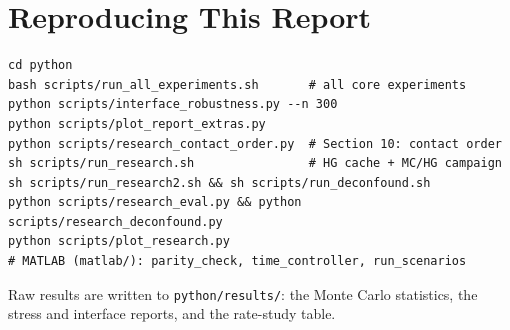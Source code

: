 \documentclass[11pt,a4paper]{article}
\begin{document}
\section{Reproducing This Report}
\begin{verbatim}
cd python
bash scripts/run_all_experiments.sh       # all core experiments
python scripts/interface_robustness.py --n 300
python scripts/plot_report_extras.py
python scripts/research_contact_order.py  # Section 10: contact order
sh scripts/run_research.sh                # HG cache + MC/HG campaign
sh scripts/run_research2.sh && sh scripts/run_deconfound.sh
python scripts/research_eval.py && python scripts/research_deconfound.py
python scripts/plot_research.py
# MATLAB (matlab/): parity_check, time_controller, run_scenarios
\end{verbatim}
Raw results are written to \texttt{python/results/}: the Monte Carlo statistics, the stress and interface reports, and the rate-study table.
\end{document}
